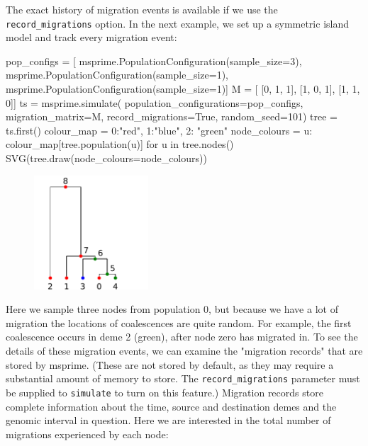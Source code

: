 \documentclass[graybox]{svmult}
\newcommand{\includenbimage}[1]{\begin{center}\texttt{[image: \#1]}\end{center}}
\begin{document}
The exact history of migration events is available if we use the
\texttt{record\_migrations} option. In the next example, we set up a
symmetric island model and track every migration event:

\begin{pythoncode}
pop_configs = [
    msprime.PopulationConfiguration(sample_size=3),
    msprime.PopulationConfiguration(sample_size=1),
    msprime.PopulationConfiguration(sample_size=1)]
M = [
    [0, 1, 1],
    [1, 0, 1],
    [1, 1, 0]]
ts  = msprime.simulate(
    population_configurations=pop_configs, migration_matrix=M,
    record_migrations=True, random_seed=101)
tree = ts.first()
colour_map = {0:"red", 1:"blue", 2: "green"}
node_colours = {
    u: colour_map[tree.population(u)] for u in tree.nodes()}
SVG(tree.draw(node_colours=node_colours))
\end{pythoncode}

\begin{figure}
  \begin{center}
    \includegraphics[width=0.38\textwidth]{images/simulations_28_0.pdf}
    \end{center}
\end{figure}

    Here we sample three nodes from population 0, but because we have a lot
of migration the locations of coalescences are quite random. For
example, the first coalescence occurs in deme 2 (green), after node zero
has migrated in. To see the details of these migration events, we can
examine the "migration records" that are stored by msprime. (These are
not stored by default, as they may require a substantial amount of
memory to store. The \texttt{record\_migrations} parameter must be
supplied to \texttt{simulate} to turn on this feature.) Migration
records store complete information about the time, source and
destination demes and the genomic interval in question. Here we are
interested in the total number of migrations experienced by each node:
\end{document}

